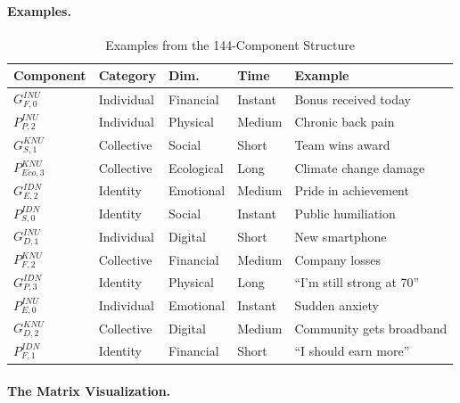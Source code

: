 \paragraph{Examples.}

\begin{table}[htbp]
\centering
\caption{Examples from the 144-Component Structure}
\label{tab:144-examples}
\renewcommand{\arraystretch}{1.3}
\begin{tabular}{@{}lllll@{}}
\toprule
\textbf{Component} & \textbf{Category} & \textbf{Dim.} & \textbf{Time} & \textbf{Example} \\
\midrule
$G^{INU}_{F,0}$ & Individual & Financial & Instant & Bonus received today \\
$P^{INU}_{P,2}$ & Individual & Physical & Medium & Chronic back pain \\
$G^{KNU}_{S,1}$ & Collective & Social & Short & Team wins award \\
$P^{KNU}_{Eco,3}$ & Collective & Ecological & Long & Climate change damage \\
$G^{IDN}_{E,2}$ & Identity & Emotional & Medium & Pride in achievement \\
$P^{IDN}_{S,0}$ & Identity & Social & Instant & Public humiliation \\
$G^{INU}_{D,1}$ & Individual & Digital & Short & New smartphone \\
$P^{KNU}_{F,2}$ & Collective & Financial & Medium & Company losses \\
$G^{IDN}_{P,3}$ & Identity & Physical & Long & ``I'm still strong at 70'' \\
$P^{INU}_{E,0}$ & Individual & Emotional & Instant & Sudden anxiety \\
$G^{KNU}_{D,2}$ & Collective & Digital & Medium & Community gets broadband \\
$P^{IDN}_{F,1}$ & Identity & Financial & Short & ``I should earn more'' \\
\bottomrule
\end{tabular}
\end{table}

\paragraph{The Matrix Visualization.}

